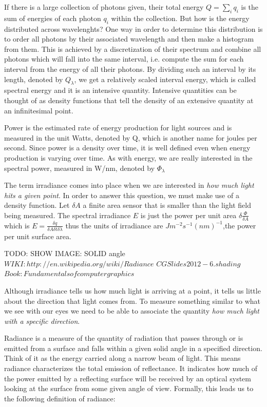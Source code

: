 If there is a large collection of photons given, their total energy $Q = \sum_i q_i$ is the sum of energies of each photon $q_i$ within the collection. But how is the energy distributed across wavelenghts? One way in order to determine this distribution is to order all photons by their associated wavelength and then make a histogram from them. This is achieved by a discretization of their spectrum and combine all photons which will fall into the same interval, i.e. compute the sum for each interval from the energy of all their photons. By dividing such an interval by its length, denoted by $Q_\lambda$, we get a relatively scaled interval energy, which is called spectral energy and it is an intensive quantity. Intensive quantities can be thought of as density functions that tell the density of an extensive quantity at an infinitesimal point.

Power is the estimated rate of energy production for light sources and is measured in the unit Watts, denoted by Q, which is another name for joules per second. Since power is a density over time, it is well defined even when energy production is varying over time. As with energy, we are really interested in the spectral power, measured in W/nm, denoted by $\Phi_\lambda$

The term irradiance comes into place when we are interested in \textit{how much light hits a given point}. In order to answer this question, we must make use of a density function. Let $\delta A$ a finite area sensor that is smaller than the light field being measured. The spectral irradiance $E$ is just the power per unit area $\delta \frac{\Phi}{\delta A}$ which is $E = \frac{\delta q}{\delta A \delta t \delta \lambda}$ thus the units of irradiance are $Jm^{-2}s^{-1}(nm)^{-1}$,the power per unit surface area.


TODO: SHOW IMAGE: SOLID angle
$WIKI: http://en.wikipedia.org/wiki/Radiance$
$CG Slides 2012 - 6.shading$
$Book: Fundamentals of computer graphics$

Although irradiance tells us how much light is arriving at a point, it tells us little about the direction that light comes from. To measure something similar to what we see with our eyes we need to be able to associate the quantity \textit{how much light with a specific direction}. 

Radiance is a measure of the quantity of radiation that passes through or is emitted from a surface and falls within a given solid angle in a specified direction. Think of it as the energy carried along a narrow beam of light. 
This means radiance characterizes the total emission of reflectance. It indicates how much of the power emitted by a reflecting surface will be received by an optical system looking at the surface from some given angle of view. Formally, this leads us to the following definition of radiance: 


